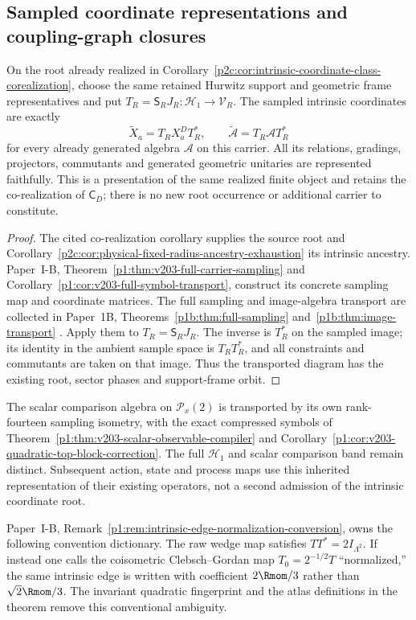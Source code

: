 \documentclass[12pt,a4paper]{article}
\begin{document}
\subsection{Sampled coordinate representations and coupling-graph closures}
\begin{corollary}
\label{p2c:cor:v204-sampled-realization}
On the root already realized in
Corollary~\ref{p2c:cor:intrinsic-coordinate-class-corealization}, choose the
same retained Hurwitz support and geometric frame representatives and put
$T_R=\mathsf S_RJ_R:\mathcal H_1\to\mathcal V_R$.
The sampled intrinsic coordinates are exactly
\[
 \widetilde X_a=T_RX_a^DT_R^*,\qquad
 \widetilde{\mathcal A}=T_R\mathcal A T_R^*
\]
for every already generated algebra $\mathcal A$ on this carrier.
All its relations, gradings, projectors, commutants and generated geometric
unitaries are represented faithfully. This is a presentation of the same
realized finite object and retains the co-realization of $\mathsf C_D$;
there is no new root occurrence or additional carrier to constitute.
\end{corollary}
\begin{proof}
The cited co-realization corollary supplies the source root and
Corollary~\ref{p2c:cor:physical-fixed-radius-ancestry-exhaustion} its
intrinsic ancestry. Paper~I-B, Theorem~\ref{p1:thm:v203-full-carrier-sampling}
and Corollary~\ref{p1:cor:v203-full-symbol-transport}, construct its concrete
sampling map and coordinate matrices. The full sampling and image-algebra
transport are collected in Paper~1B,
Theorems~\ref{p1b:thm:full-sampling} and~\ref{p1b:thm:image-transport}
\cite{Kugelmann2026Paper1B}. Apply them to $T_R=\mathsf S_RJ_R$.
The inverse is $T_R^*$ on the sampled image; its identity in the ambient
sample space is $T_RT_R^*$, and all constraints and commutants are taken
on that image. Thus the transported diagram has the existing root,
sector phases and support-frame orbit.
\end{proof}
The scalar comparison algebra on $\mathcal P_x(2)$ is transported by its
own rank-fourteen sampling isometry, with the exact compressed symbols of
Theorem~\ref{p1:thm:v203-scalar-observable-compiler} and
Corollary~\ref{p1:cor:v203-quadratic-top-block-correction}. The full
$\mathcal H_1$ and scalar comparison band remain distinct. Subsequent
action, state and process maps use this inherited representation of their
existing operators, not a second admission of the intrinsic coordinate root.

\begin{remark}
Paper~I-B, Remark~\ref{p1:rem:intrinsic-edge-normalization-conversion}, owns the
following convention dictionary.  The raw wedge map satisfies
\(TT^*=2I_{\Lambda^2}\).  If instead one calls
the coisometric Clebsch--Gordan map \(T_0=2^{-1/2}T\) ``normalized,'' the same
intrinsic edge is written with coefficient \(2\Rmom/3\) rather than
\(\sqrt2\Rmom/3\).  The invariant quadratic fingerprint and the atlas
definitions in the theorem remove this conventional ambiguity.
\end{remark}
\end{document}
